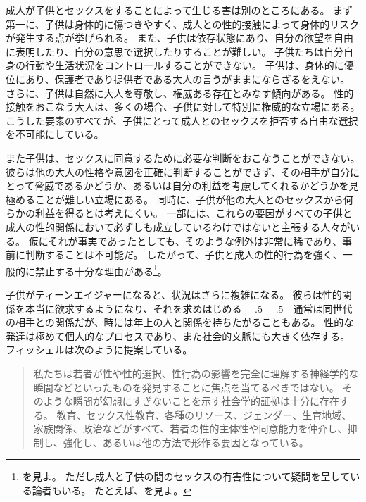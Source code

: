 \documentclass[paper=a4,book,openany]{jlreq}
\def\DDASH{―\kern-.5\zw―\kern-.5\zw―} %
\begin{document}
成人が子供とセックスをすることによって生じる害は別のところにある。
まず第一に、子供は身体的に傷つきやすく、成人との性的接触によって身体的リスクが発生する点が挙げられる。
また、子供は依存状態にあり、自分の欲望を自由に表明したり、自分の意思で選択したりすることが難しい。
子供たちは自分自身の行動や生活状況をコントロールすることができない。
子供は、身体的に優位にあり、保護者であり提供者である大人の言うがままにならざるをえない。
さらに、子供は自然に大人を尊敬し、権威ある存在とみなす傾向がある。
性的接触をおこなう大人は、多くの場合、子供に対して特別に権威的な立場にある。
こうした要素のすべてが、子供にとって成人とのセックスを拒否する自由な選択を不可能にしている。

また子供は、セックスに同意するために必要な判断をおこなうことができない。
彼らは他の大人の性格や意図を正確に判断することができず、その相手が自分にとって脅威であるかどうか、あるいは自分の利益を考慮してくれるかどうかを見極めることが難しい立場にある。
同時に、子供が他の大人とのセックスから何らかの利益を得るとは考えにくい。
一部には、これらの要因がすべての子供と成人の性的関係において必ずしも成立しているわけではないと主張する人々がいる。
仮にそれが事実であったとしても、そのような例外は非常に稀であり、事前に判断することは不可能だ。
したがって、子供と成人の性的行為を強く、一般的に禁止する十分な理由がある\footnote{ \citet{malon15:_adult_child_sex_limit_liber_sexual_moral}を見よ。
ただし成人と子供の間のセックスの有害性について疑問を呈している論者もいる。
たとえば\citet{levine02:_harmf_minor}、\citet{brongersma90:_boy_lover_their_influen_boys}を見よ。}。
\nocite{levine02:_harmf_minor} \nocite{brongersma90:_boy_lover_their_influen_boys}

子供がティーンエイジャーになると、状況はさらに複雑になる。
彼らは性的関係を本当に欲求するようになり、それを求めはじめる{\DDASH}通常は同世代の相手との関係だが、時には年上の人と関係を持ちたがることもある。
性的な発達は極めて個人的なプロセスであり、また社会的文脈にも大きく依存する。
フィッシェルは次のように提案している。

\begin{quote}
私たちは若者が性や性的選択、性行為の影響を完全に理解する神経学的な瞬間などといったものを発見することに焦点を当てるべきではない。
そのような瞬間が幻想にすぎないことを示す社会学的証拠は十分に存在する。
教育、セックス性教育、各種のリソース、ジェンダー、生育地域、家族関係、政治などがすべて、若者の性的主体性や同意能力を仲介し、抑制し、強化し、あるいは他の方法で形作る要因となっている。
\citep[p.305]{fischel10:_per_se_power}
\end{quote}
\end{document}
